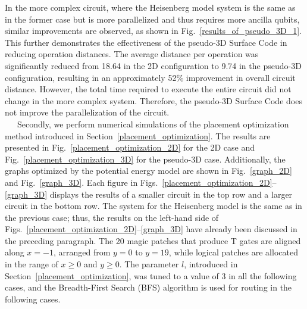 \documentclass[a4paper,11pt]{ltjsarticle}
\begin{document}
{    In the more complex circuit, where the Heisenberg model system is the same as in the former case but is more parallelized and thus requires more ancilla qubits, similar improvements are observed, as shown in Fig.~\ref{results_of_pseudo_3D_1}. This further demonstrates the effectiveness of the pseudo-3D Surface Code in reducing operation distances. The average distance per operation was significantly reduced from 18.64 in the 2D configuration to 9.74 in the pseudo-3D configuration, resulting in an approximately 52\% improvement in overall circuit distance. However, the total time required to execute the entire circuit did not change in the more complex system. Therefore, the pseudo-3D Surface Code does not improve the parallelization of the circuit.\\
    \ \ \ Secondly, we perform numerical simulations of the placement optimization method introduced in Section~\ref{placement_optimization}. The results are presented in Fig.~\ref{placement_optimization_2D} for the 2D case and Fig.~\ref{placement_optimization_3D} for the pseudo-3D case. Additionally, the graphs optimized by the potential energy model are shown in Fig.~\ref{graph_2D} and Fig.~\ref{graph_3D}. Each figure in Figs.~\ref{placement_optimization_2D}--\ref{graph_3D} displays the results of a smaller circuit in the top row and a larger circuit in the bottom row. The system for the Heisenberg model is the same as in the previous case; thus, the results on the left-hand side of Figs.~\ref{placement_optimization_2D}--\ref{graph_3D} have already been discussed in the preceding paragraph. The 20 magic patches that produce T gates are aligned along $x = -1$, arranged from $y = 0$ to $y = 19$, while logical patches are allocated in the range of $x \geq 0$ and $y \geq 0$. The parameter $l$, introduced in Section~\ref{placement_optimization}, was tuned to a value of 3 in all the following cases, and the Breadth-First Search (BFS) algorithm is used for routing in the following cases.

}
\end{document}
